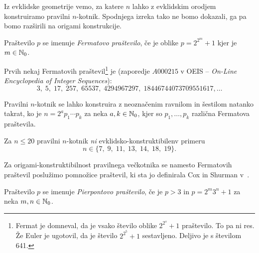 Iz evklidske geometrije vemo, za katere $n$ lahko z evklidskim orodjem konstruiramo pravilni $n$-kotnik. Spodnjega izreka tako ne bomo dokazali, ga pa bomo razširili na origami konstrukcije.

\begin{definicija}
    Praštevilo $p$ se imenuje \emph{Fermatovo praštevilo}, če je oblike $p = 2^{2^m} + 1$ kjer je $m \in \mathbb N_0$.
\end{definicija}
Prvih nekaj Fermatovih praštevil\footnote{Fermat je domneval, da je vsako število oblike $2^{2^s} + 1$ praštevilo. To pa ni res. Že Euler je ugotovil, da je število $2^{2^5} + 1$ sestavljeno. Deljivo je s številom 641.} je (zaporedje $A000215$ v OEIS -- \emph{On-Line Encyclopedia of Integer Sequences}):
$$3,\; 5,\; 17,\; 257,\; 65537,\; 4294967297,\; 18446744073709551617, \ldots $$

\begin{izrek}
    Pravilni $n$-kotnik se lahko konstruira z neoznačenim ravnilom in šestilom natanko takrat, ko je $n = 2^a p_1 \cdots p_k$ za neka $a,k \in \mathbb N_0$, kjer so $p_1, \ldots, p_k$ različna Fermatova praštevila.
\end{izrek}

Za $n \leq 20$ pravilni $n$-kotnik \emph{ni} evklidsko-konstruktibilenv primeru
$$n \in \{ 7,\;9,\;11,\;13,\;14,\;18,\;19 \}.$$

Za origami-konstruktibilnost pravilnega večkotnika se namesto Fermatovih praštevil poslužimo pomnožice praštevil, ki sta jo definirala Cox in Shurman v~\cite{cox2005}.

\begin{definicija}
    Praštevilo $p$ se imenuje \emph{Pierpontovo praštevilo}, če je $p > 3$ in $p = 2^m3^n + 1$ za neka $m,n \in \mathbb N_0$.
\end{definicija}

